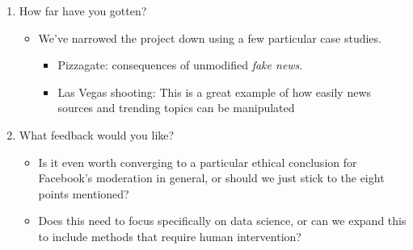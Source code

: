 \documentclass[11pt]{article}
\begin{document}
\begin{enumerate}
  \item How far have you gotten? 
    \begin{itemize}
      \item We've narrowed the project down using a few particular case studies.
        \begin{itemize}
          \item Pizzagate: consequences of unmodified \textit{fake news}.
          \item Las Vegas shooting: This is a great example of how easily news sources and trending topics can be manipulated
        \end{itemize}
    \end{itemize}

  \item What feedback would you like?
    \begin{itemize}
      \item Is it even worth converging to a particular ethical conclusion for Facebook's moderation in general, or should we just stick to the eight points mentioned?
      \item Does this need to focus specifically on data science, or can we expand this to include methods that require human intervention?
    \end{itemize}

\end{enumerate}
\end{document}

